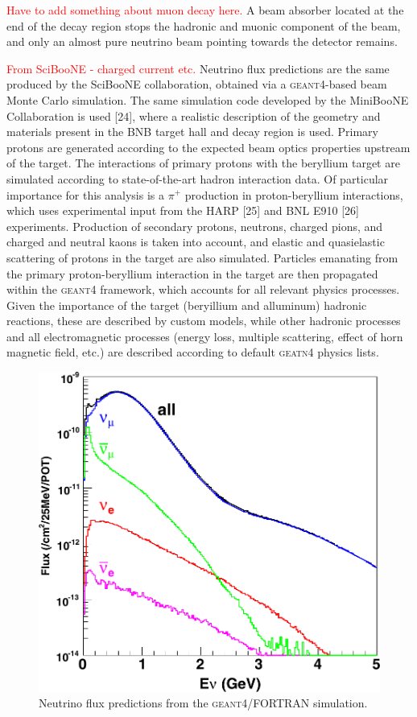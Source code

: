\textcolor{red}{Have to add something about muon decay here.}
A beam absorber located at the end of the decay region stops the hadronic and muonic %
component of the beam, and only an almost pure neutrino beam pointing towards %
the detector remains.

\textcolor{red}{From SciBooNE - charged current etc.}
Neutrino flux predictions are the same produced by the SciBooNE collaboration, obtained via a %
\textsc{geant4}-based beam Monte Carlo simulation.
The same simulation code developed by the MiniBooNE Collaboration is used [24], %
where a realistic description of the geometry and materials present %
in the BNB target hall and decay region is used.
Primary protons are generated according to the expected beam optics properties upstream 
of the target.
The interactions of primary protons with the beryllium target are simulated according %
to state-of-the-art hadron interaction data. 
Of particular importance for this analysis is a $\pi^+$ production in proton-beryllium interactions, %
which uses experimental input from the HARP [25] and BNL E910 [26] experiments. 
Production of secondary protons, neutrons, charged pions, and charged and neutral %
kaons is taken into account, and elastic and quasielastic scattering of protons in the target %
are also simulated.
Particles emanating from the primary proton-beryllium interaction in the target are %
then propagated within the \textsc{geant4} framework, which accounts for all relevant %
physics processes. 
Given the importance of the target (beryillium and alluminum) hadronic reactions, these are %
described by custom models, while other hadronic processes %
and all electromagnetic processes (energy loss, multiple scattering, %
effect of horn magnetic field, etc.) are described according to default \textsc{geatn4} physics lists.

\begin{figure}
  \centering
  \includegraphics[scale=0.25]{pics/fluxprediction}
  \caption{Neutrino flux predictions from the \textsc{geant4}/FORTRAN simulation.}
  \label{fig:fluxp}
\end{figure}

